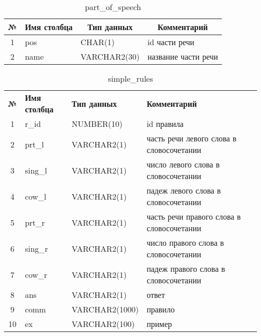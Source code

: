 \documentclass[main]{subfiles}
\begin{document}
\begin{table}[!h]
	\begin{center}
		\captionsetup{format=hang,labelsep = endash, singlelinecheck=false}
		\caption{part\_of\_speech}
		\begin{tabular}{|c|l|l|l|}
			\hline
			\textbf{№} & \multicolumn{1}{c|}{\textbf{Имя столбца}} & \multicolumn{1}{c|}{\textbf{Тип данных}} & \multicolumn{1}{c|}{\textbf{Комментарий}} \\ \hline
			1&pos &CHAR(1) & id части речи \\ \hline
			2& name& VARCHAR2(30) & название части речи \\ \hline
		\end{tabular}
	\end{center}
\end{table}
\begin{longtable}[c]{|c|l|l|p{215px}|}
		\captionsetup{format=hang,labelsep = endash, singlelinecheck=false}
		\caption{simple\_rules}\\ \hline
			\textbf{№} & \textbf{Имя столбца} & \textbf{Тип данных} & \textbf{Комментарий} \\ \hline
			1&r\_id & NUMBER(10)&id правила\\ \hline
			2& prt\_l & VARCHAR2(1)& часть речи левого слова в словосочетании \\ \hline
			3& sing\_l &VARCHAR2(1) & число левого слова в словосочетании \\ \hline
			4& cow\_l &VARCHAR2(1) & падеж левого слова в словосочетании \\ \hline
			5& prt\_r &VARCHAR2(1) & часть речи правого слова в словосочетании \\ \hline
			6& sing\_r &VARCHAR2(1) & число правого слова в словосочетании \\ \hline
			7& cow\_r & VARCHAR2(1)& падеж правого слова в словосочетании \\ \hline
			8&ans&VARCHAR2(1)& ответ\\ \hline
			9&comm &VARCHAR2(1000)& правило\\ \hline
			10 &ex &VARCHAR2(100)&пример  \\ \hline
\end{longtable}
\end{document}
